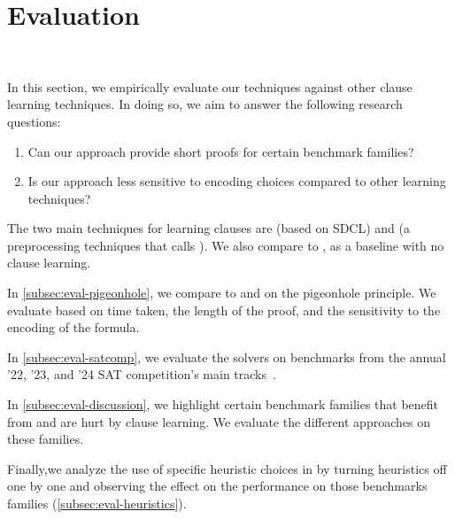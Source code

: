\section{Evaluation}~\label{sec:evaluation}

In this section, we empirically evaluate our techniques against other \pr clause
learning techniques. In doing so, we aim to answer the following research questions:


\begin{enumerate}
    \item Can our approach provide short \pr proofs for certain benchmark families?
    \item Is our approach less sensitive to encoding choices compared to other
    \pr learning techniques?
\end{enumerate}


The two main techniques for learning \pr clauses are \sadical (based on SDCL)
and \prelearn (a preprocessing techniques that calls \sadical). We also compare 
to \cadical, as a baseline with no \pr clause learning.

In \autoref{subsec:eval-pigeonhole}, we compare \tool to \cadical and \sadical
on the pigeonhole principle. We evaluate based on time taken, the length of
the proof, and the sensitivity to the encoding of the formula. 


In \autoref{subsec:eval-satcomp}, we evaluate the solvers on benchmarks from the
annual '22, '23, and '24 SAT competition's main
tracks~\cite{satcomp2022,satcomp2023,satcomp2024}.

In \autoref{subsec:eval-discussion}, we highlight certain benchmark families
that benefit from and are hurt by \pr clause learning. We evaluate the different approaches on these families.


Finally,we analyze the use of specific heuristic choices in \tool
by turning heuristics off one by one and observing the effect on the performance
on those benchmarks families (\autoref{subsec:eval-heuristics}). 

